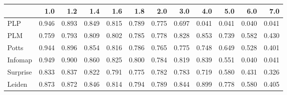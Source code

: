 \begin{tabular}{lrrrrrrrrrrr}
\toprule
{} &   1.0 &   1.2 &   1.4 &   1.6 &   1.8 &   2.0 &   3.0 &   4.0 &   5.0 &   6.0 &   7.0 \\
\midrule
PLP      & 0.946 & 0.893 & 0.849 & 0.815 & 0.789 & 0.775 & 0.697 & 0.041 & 0.041 & 0.040 & 0.041 \\
PLM      & 0.759 & 0.793 & 0.809 & 0.802 & 0.785 & 0.778 & 0.828 & 0.853 & 0.739 & 0.582 & 0.430 \\
Potts    & 0.944 & 0.896 & 0.854 & 0.816 & 0.786 & 0.765 & 0.775 & 0.748 & 0.649 & 0.528 & 0.401 \\
Infomap  & 0.949 & 0.900 & 0.860 & 0.825 & 0.800 & 0.784 & 0.819 & 0.839 & 0.551 & 0.040 & 0.041 \\
Surprise & 0.833 & 0.837 & 0.822 & 0.791 & 0.775 & 0.782 & 0.783 & 0.719 & 0.580 & 0.431 & 0.326 \\
Leiden   & 0.873 & 0.872 & 0.846 & 0.814 & 0.794 & 0.789 & 0.844 & 0.899 & 0.778 & 0.580 & 0.405 \\
\bottomrule
\end{tabular}
